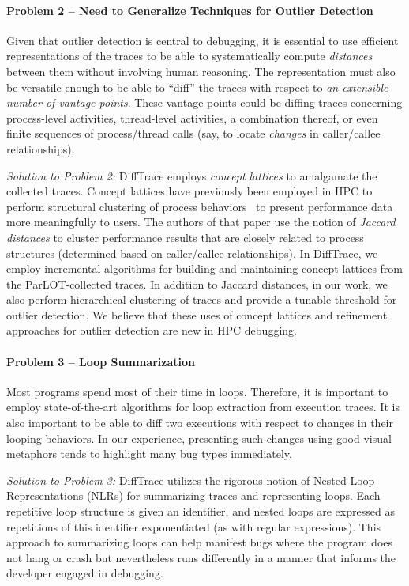 \paragraph{Problem 2 -- Need to Generalize Techniques for Outlier Detection\/}
Given that outlier detection is central to debugging,
it is essential to use efficient representations of the traces
to be able to systematically compute
{\em distances} between them without
involving human reasoning.
%
The representation must also be versatile enough to
be able to ``diff'' the traces
with respect to {\em an extensible number of vantage points}.
%
These vantage points could be diffing traces concerning process-level activities,
thread-level activities, a combination thereof,
or even finite sequences of process/thread calls (say, to locate {\em changes}
in caller/callee relationships).


{\em Solution to Problem 2:\/}
DiffTrace employs {\em concept lattices} to amalgamate the collected traces.
%
Concept lattices have previously been employed in HPC to perform structural
clustering of process behaviors~\cite{weberStructural} to present performance data more
meaningfully to users.
%
The authors of that paper use the notion of {\em Jaccard distances}
to cluster performance results that are closely related to process structures
(determined based on caller/callee relationships).
%
In DiffTrace, we employ incremental algorithms for building and maintaining
concept lattices from the ParLOT-collected traces.
%
In addition to Jaccard distances, in our work, we also perform hierarchical
clustering of traces and provide a tunable threshold for outlier detection.
%
We believe that these uses of concept lattices and refinement approaches
for outlier detection are new in HPC debugging.


\paragraph{Problem 3 -- Loop Summarization\/}
Most programs spend most of their time in loops.
%
Therefore, it is important to employ state-of-the-art algorithms for
loop extraction from execution traces.
%
It is also important
to be able to diff two executions with respect to changes in their looping behaviors.
%
In our experience, presenting such changes using good visual metaphors
tends to highlight many bug types immediately.


{\em Solution to Problem 3:\/}
DiffTrace utilizes the rigorous notion of Nested Loop Representations (NLRs) for
summarizing traces and representing loops.
%
Each repetitive loop structure is given an identifier, and nested loops are
expressed as repetitions of this identifier exponentiated (as with regular
expressions).
%
This approach to summarizing loops can help manifest
bugs where the program does not hang or crash but nevertheless
runs differently in a manner that informs the developer engaged in debugging.

